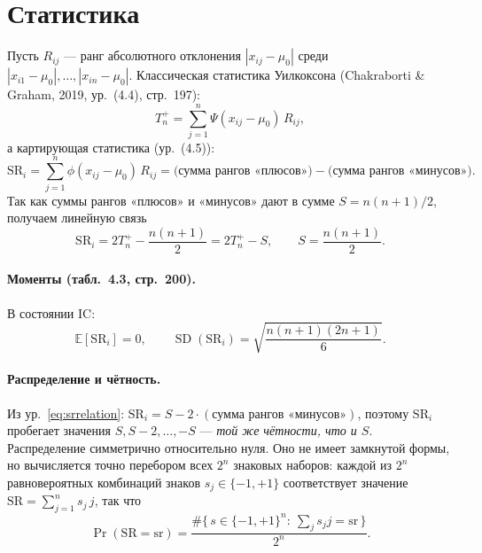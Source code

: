 \documentclass[11pt,a4paper]{article}
\newcommand{\SR}{\mathrm{SR}}
\begin{document}
\section{Статистика}

Пусть $R_{ij}$ --- ранг абсолютного отклонения $|x_{ij}-\mu_0|$ среди
$|x_{i1}-\mu_0|,\dots,|x_{in}-\mu_0|$. Классическая статистика
Уилкоксона (Chakraborti \& Graham, 2019, ур.~(4.4), стр.~197):
\begin{equation}
T_n^{+}=\sum_{j=1}^{n}\Psi(x_{ij}-\mu_0)\,R_{ij},
\end{equation}
а картирующая статистика (ур.~(4.5)):
\begin{equation}
\SR_i=\sum_{j=1}^{n}\phi(x_{ij}-\mu_0)\,R_{ij}
     = \bigl(\text{сумма рангов «плюсов»}\bigr)-\bigl(\text{сумма рангов «минусов»}\bigr).
\label{eq:sr}
\end{equation}
Так как суммы рангов «плюсов» и «минусов» дают в сумме
$S=n(n+1)/2$, получаем линейную связь
\begin{equation}
\SR_i = 2T_n^{+}-\frac{n(n+1)}{2} = 2T_n^{+}-S,
\qquad S=\frac{n(n+1)}{2}.
\label{eq:srrelation}
\end{equation}

\paragraph{Моменты (табл.~4.3, стр.~200).}
В состоянии IC:
\begin{equation}
\mathbb{E}[\SR_i]=0,
\qquad
\operatorname{SD}(\SR_i)=\sqrt{\frac{n(n+1)(2n+1)}{6}} .
\label{eq:srmoments}
\end{equation}

\paragraph{Распределение и чётность.}
Из ур.~\eqref{eq:srrelation}:
$\SR_i=S-2\cdot(\text{сумма рангов «минусов»})$, поэтому $\SR_i$
пробегает значения $S,S-2,\dots,-S$ --- \emph{той же чётности, что и
$S$}. Распределение симметрично относительно нуля. Оно не имеет
замкнутой формы, но вычисляется точно перебором всех $2^n$ знаковых
наборов: каждой из $2^n$ равновероятных комбинаций знаков
$s_j\in\{-1,+1\}$ соответствует значение
$\SR=\sum_{j=1}^{n}s_j\,j$, так что
\begin{equation}
\Pr(\SR=\mathrm{sr})=\frac{\#\{\,s\in\{-1,+1\}^n:\ \textstyle\sum_j s_j j=\mathrm{sr}\,\}}{2^n}.
\label{eq:srpmf}
\end{equation}
\end{document}
